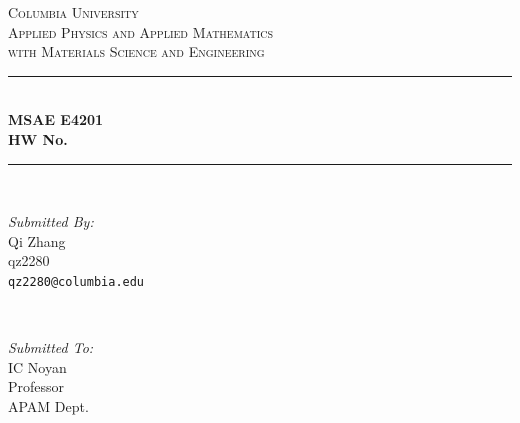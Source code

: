 \begin{titlepage}

	\newcommand{\HRule}{\rule{\linewidth}{0.5mm}} %

	\center %


	\textsc{\LARGE Columbia University}\\[0.3cm] %
	\textsc{\Large Applied Physics and Applied Mathematics\\
		\large with Materials Science and Engineering}\\[0.5cm] %


	\HRule \\[0.4cm]
	{ \huge \bfseries MSAE E4201\\[0.2cm]  HW No. }\\[0.03cm] %
	\HRule \\[1.5cm]



	\begin{minipage}{0.4\textwidth}
		\begin{flushleft} \large
			\emph{Submitted By:}\\
			Qi Zhang \\qz2280\\\texttt{qz2280@columbia.edu} %
		\end{flushleft}
	\end{minipage}
	~
	\begin{minipage}{0.4\textwidth}
		\begin{flushright} \large
			\emph{Submitted To:} \\
			IC Noyan\\Professor\\APAM Dept. %
		\end{flushright}
	\end{minipage}\\[1cm]


\end{titlepage}
